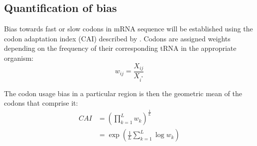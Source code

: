 \documentclass[11pt]{nih}
\begin{document}
\subsection{Quantification of bias}
Bias towards fast or slow codons in mRNA sequence will be established using the codon adaptation index (CAI) described by \citet{sharp1987codon}. Codons are assigned weights depending on the frequency of their corresponding tRNA in the appropriate organism:
\begin{equation}
w_{ij} = \frac{X_{ij}}{X_{i^*}}
\end{equation}

The codon usage bias in a particular region is then the geometric mean of the codons that comprise it:
\begin{align}
CAI &= (\displaystyle \prod_{k=1}^L w_k )^{\frac{1}{L}} \\
&= \exp(\frac{1}{L} \displaystyle \sum_{k=1}^L \log w_k)
\end{align}
\end{document}
